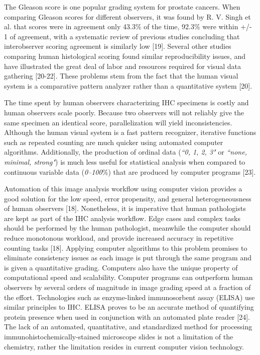 \documentclass[12pt]{article}
\begin{document}
The Gleason score is one popular grading system for prostate cancers. When comparing Gleason scores for different observers, it was found by R. V. Singh et al. that scores were in agreement only 43.3\% of the time, 92.3\% were within +/- 1 of agreement, with a systematic review of previous studies concluding that interobserver scoring agreement is similarly low [19]. Several other studies comparing human histological scoring found similar reproducibility issues, and have illustrated the great deal of labor and resources required for visual data gathering [20-22]. These problems stem from the fact that the human visual system is a comparative pattern analyzer rather than a quantitative system [20]. 

The time spent by human observers characterizing IHC specimens is costly and human observers scale poorly. Because two observers will not reliably give the same specimen an identical score, parallelization will yield inconsistencies. Although the human visual system is a fast pattern recognizer, iterative functions such as repeated counting are much quicker using automated computer algorithms. Additionally, the production of ordinal data (\textit{``0, 1, 2, 3"} or \textit{``none, minimal, strong"}) is much less useful for statistical analysis when compared to continuous variable data (\textit{0--100}\%) that are produced by computer programs [23]. 

Automation of this image analysis workflow using computer vision provides a good solution for the low speed, error propensity, and general heterogeneousness of human observers [18]. Nonetheless, it is imperative that human pathologists are kept as part of the IHC analysis workflow. Edge cases and complex tasks should be performed by the human pathologist, meanwhile the computer should reduce monotonous workload, and provide increased accuracy in repetitive counting tasks [18]. Applying computer algorithms to this problem promises to eliminate consistency issues as each image is put through the same program and is given a quantitative grading. Computers also have the unique property of computational speed and scalability. Computer programs can outperform human observers by several orders of magnitude in image grading speed at a fraction of the effort. Technologies such as enzyme-linked immunosorbent assay (ELISA) use similar principles to IHC. ELISA proves to be an accurate method of quantifying protein presence when used in conjunction with an automated plate reader [24]. The lack of an automated, quantitative, and standardized method for processing immunohistochemically-stained microscope slides is not a limitation of the chemistry, rather the limitation resides in current computer vision technology.
\end{document}
